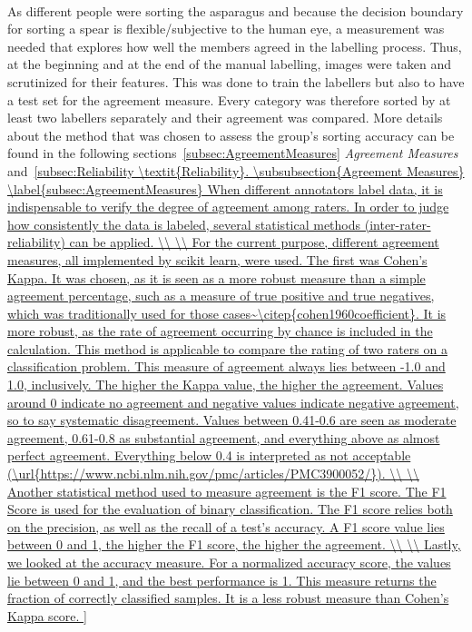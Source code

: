 \\
As different people were sorting the asparagus and because the decision boundary for sorting a spear is flexible/subjective to the human eye, a measurement was needed that explores how well the members agreed in the labelling process. Thus, at the beginning and at the end of the manual labelling, images were taken and scrutinized for their features. This was done to train the labellers but also to have a test set for the agreement measure. Every category was therefore sorted by at least two labellers separately and their agreement was compared. More details about the method that was chosen to assess the group’s sorting accuracy can be found in the following sections~\ref{subsec:AgreementMeasures} \textit{Agreement Measures} and~\ref{subsec:Reliability \textit{Reliability}.


\subsubsection{Agreement Measures}
\label{subsec:AgreementMeasures}

When different annotators label data, it is indispensable to verify the degree of agreement among raters. In order to judge how consistently the data is labeled, several statistical methods (inter-rater-reliability) can be applied. \\
 \\
For the current purpose, different agreement measures, all implemented by scikit learn, were used. The first was Cohen’s Kappa. It was chosen, as it is seen as a more robust measure than a simple agreement percentage, such as a measure of true positive and true negatives, which was traditionally used for those cases~\citep{cohen1960coefficient}. It is more robust, as the rate of agreement occurring by chance is included in the calculation. This method is applicable to compare the rating of two raters on a classification problem. This measure of agreement always lies between -1.0 and 1.0, inclusively. The higher the Kappa value, the higher the agreement. Values around 0 indicate no agreement and negative values indicate negative agreement, so to say systematic disagreement. Values between 0.41-0.6 are seen as moderate agreement, 0.61-0.8 as substantial agreement, and everything above as almost perfect agreement. Everything below 0.4 is interpreted as not acceptable (\url{https://www.ncbi.nlm.nih.gov/pmc/articles/PMC3900052/}). \\
\\
Another statistical method used to measure agreement is the F1 score. The F1 Score is used for the evaluation of binary classification. The F1 score relies both on the precision, as well as the recall of a test’s accuracy. A F1 score value lies between 0 and 1, the higher the F1 score, the higher the agreement. \\
\\
Lastly, we looked at the accuracy measure. For a normalized accuracy score, the values lie between 0 and 1, and the best performance is 1. This measure returns the fraction of correctly classified samples. It is a less robust measure than Cohen’s Kappa score.

}
